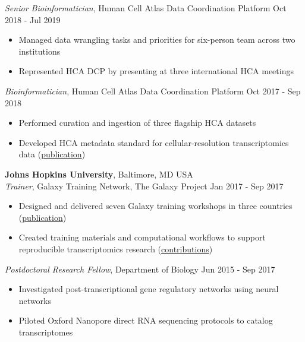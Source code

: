 \documentclass[margin,line]{res}
\begin{document}
\begin{resume}
{\em Senior Bioinformatician}, Human Cell Atlas Data Coordination Platform \hfill {Oct 2018 - Jul 2019}
\begin{itemize}
\itemsep0em 
	\item Managed data wrangling tasks and priorities for six-person team across two institutions
	\item Represented HCA DCP by presenting at three international HCA meetings
\end{itemize}

{\em Bioinformatician}, Human Cell Atlas Data Coordination Platform \hfill {Oct 2017 - Sep 2018}
\begin{itemize}
\itemsep0em 
	\item Performed curation and ingestion of three flagship HCA datasets
	\item Developed HCA metadata standard for cellular-resolution transcriptomics data (\href{https://doi.org/10.1038/s41587-020-00744-z}{publication})
\end{itemize}

{\bf Johns Hopkins University}, Baltimore, MD USA\\
{\em Trainer}, Galaxy Training Network, The Galaxy Project \hfill {Jan 2017 - Sep 2017}
\begin{itemize}
\itemsep0em 
	\item Designed and delivered seven Galaxy training workshops in three countries (\href{https://doi.org/10.1016/j.cels.2018.05.012}{publication})
	\item Created training materials and computational workflows to support reproducible transcriptomics research (\href{https://training.galaxyproject.org/training-material/hall-of-fame/malloryfreeberg/}{contributions})
\end{itemize}

{\em Postdoctoral Research Fellow}, Department of Biology \hfill {Jun 2015 - Sep 2017}
\begin{itemize}
\itemsep0em 
	\item Investigated post-transcriptional gene regulatory networks using neural networks
	\item Piloted Oxford Nanopore direct RNA sequencing protocols to catalog transcriptomes
\end{itemize}




\end{resume}
\end{document}
